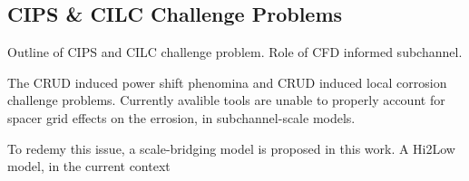 \subsection{CIPS \& CILC Challenge Problems}

Outline of CIPS and CILC challenge problem.  Role of CFD informed subchannel.

The CRUD induced power shift phenomina and CRUD induced local corrosion
challenge problems.  Currently avalible tools are unable to properly account
for spacer grid effects on the errosion, in subchannel-scale models.

To redemy this issue, a scale-bridging model is proposed in this work.  A
Hi2Low model, in the current context 




